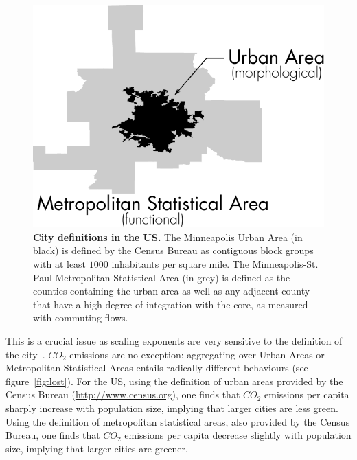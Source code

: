 \begin{figure}
    \centering
    \includegraphics[width=\textwidth]{gfx/chapter-scaling/city_definition.pdf}
    \caption{{\bf City definitions in the US.} The Minneapolis Urban Area (in
    black) is defined by the Census Bureau as contiguous block groups with at
least $1000$ inhabitants per square mile. The Minneapolis-St. Paul Metropolitan
Statistical Area (in grey) is defined as the counties containing the urban area
as well as any adjacent county that have a high degree of integration with the
core, as measured with commuting flows.\label{fig:two_definitions}}
\end{figure}


This is a crucial issue as scaling exponents are very sensitive to the
definition of the city~\cite{Arcaute:2013}.  $CO_2$ emissions are no exception:
aggregating over Urban Areas or Metropolitan Statistical Areas entails radically
different behaviours (see figure~\ref{fig:lost}). For the US, using the
definition of urban areas provided by the Census Bureau
(\url{http://www.census.org}), one finds that $CO_2$ emissions per capita
sharply increase with population size, implying that larger cities are less
green. Using the definition of metropolitan statistical areas, also provided by
the Census Bureau, one finds that $CO_2$ emissions per capita decrease slightly
with population size, implying that larger cities are greener.\\


